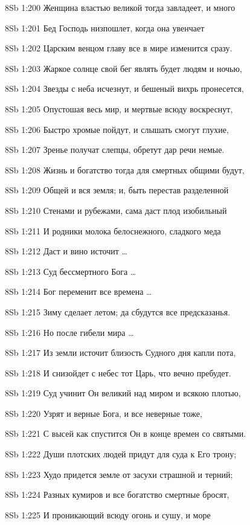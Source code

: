 \vs 8Sb 1:200 Женщина властью великой тогда завладеет, и много 

\vs 8Sb 1:201 Бед Господь низпошлет, когда она увенчает 

\vs 8Sb 1:202 Царским венцом главу  все в мире изменится сразу. 

\vs 8Sb 1:203 Жаркое солнце свой бег являть будет людям и ночью, 

\vs 8Sb 1:204 Звезды с неба исчезнут, и бешеный вихрь пронесется, 

\vs 8Sb 1:205 Опустошая весь мир, и мертвые всюду воскреснут, 

\vs 8Sb 1:206 Быстро хромые пойдут, и слышать смогут глухие, 

\vs 8Sb 1:207 Зренье получат слепцы, обретут дар речи немые. 

\vs 8Sb 1:208 Жизнь и богатство тогда для смертных общими будут, 

\vs 8Sb 1:209 Общей и вся земля; и, быть перестав разделенной 

\vs 8Sb 1:210 Стенами и рубежами, сама даст плод изобильный 

\vs 8Sb 1:211 И родники молока белоснежного, сладкого меда

\vs 8Sb 1:212 Даст и вино источит \ldots

\vs 8Sb 1:213 Суд бессмертного Бога \ldots

\vs 8Sb 1:214 Бог переменит все времена \ldots

\vs 8Sb 1:215 Зиму сделает летом; да сбудутся все предсказанья. 

\vs 8Sb 1:216 Но после гибели мира \ldots

\vs 8Sb 1:217 Из земли источит близость Судного дня капли пота,

\vs 8Sb 1:218 И снизойдет с небес тот Царь, что вечно пребудет.

\vs 8Sb 1:219 Суд учинит Он великий над миром и всякою плотью, 

\vs 8Sb 1:220 Узрят и верные Бога, и все неверные тоже,

\vs 8Sb 1:221 С высей как спустится Он в конце времен со святыми.

\vs 8Sb 1:222 Души плотских людей придут для суда к Его трону;

\vs 8Sb 1:223 Худо придется земле от засухи страшной и терний;

\vs 8Sb 1:224 Разных кумиров и все богатство смертные бросят, 

\vs 8Sb 1:225 И проникающий всюду огонь и сушу, и море

